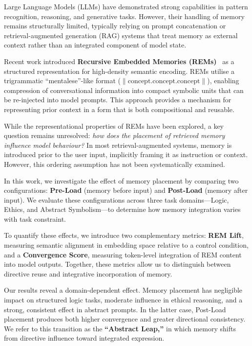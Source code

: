 \documentclass[11pt]{article}
\begin{document}
Large Language Models (LLMs) have demonstrated strong capabilities in pattern recognition, reasoning, and generative tasks. However, their handling of memory remains structurally limited, typically relying on prompt concatenation or retrieval-augmented generation (RAG) systems that treat memory as external context rather than an integrated component of model state.

Recent work introduced \textbf{Recursive Embedded Memories (REMs)}~\cite{Ley2026} as a structured representation for high-density semantic encoding. REMs utilise a trigrammatic ``mentalese''-like format (\(\|\text{concept.concept.concept}\|\)), enabling compression of conversational information into compact symbolic units that can be re-injected into model prompts. This approach provides a mechanism for representing prior context in a form that is both compositional and reusable.

While the representational properties of REMs have been explored, a key question remains unresolved: \textit{how does the placement of retrieved memory influence model behaviour?} In most retrieval-augmented systems, memory is introduced prior to the user input, implicitly framing it as instruction or context. However, this ordering assumption has not been systematically examined.

In this work, we investigate the effect of memory placement by comparing two configurations: \textbf{Pre-Load} (memory before input) and \textbf{Post-Load} (memory after input). We evaluate these configurations across three task domains—Logic, Ethics, and Abstract Symbolism—to determine how memory integration varies with task constraint.

To quantify these effects, we introduce two complementary metrics: \textbf{REM Lift}, measuring semantic alignment in embedding space relative to a control condition, and a \textbf{Convergence Score}, measuring token-level integration of REM content into model outputs. Together, these metrics allow us to distinguish between directive reuse and integrative incorporation of memory.

Our results reveal a domain-dependent effect. Memory placement has negligible impact on structured logic tasks, moderate influence in ethical reasoning, and a strong, consistent effect in abstract prompts. In the latter case, Post-Load placement produces both higher convergence and greater directional consistency. We refer to this transition as the \textbf{``Abstract Leap,''} in which memory shifts from directive influence toward integrated expression.
\end{document}
